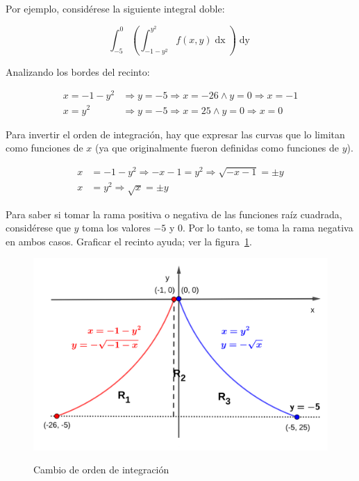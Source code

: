 \documentclass{article}
\begin{document}
\begin{enumerate}[(A)]
Por ejemplo, considérese la siguiente integral doble:

\begin{equation}
\int_{-5}^0 \left( \int_{-1-y^2}^{y^2} f(x,y) \mathop{dx} \right) \mathop{dy}
\end{equation}

Analizando los bordes del recinto:

\begin{align}
x = -1-y^2 &\Rightarrow y = -5 \Rightarrow x = -26 \wedge y = 0 \Rightarrow x = -1 \\
x = y^2 &\Rightarrow y = -5 \Rightarrow x =25 \wedge y = 0 \Rightarrow x = 0
\end{align}

Para invertir el orden de integración, hay que expresar las curvas que lo limitan como funciones de $x$ (ya que originalmente fueron definidas como funciones de $y$).

\begin{align}
x &= -1-y^2 \Rightarrow -x - 1 = y^2 \Rightarrow \sqrt{-x-1} = \pm y \\
x &= y^2 \Rightarrow \sqrt{x} = \pm y
\end{align}

Para saber si tomar la rama positiva o negativa de las funciones raíz cuadrada, considérese que $y$ toma los valores $-5$ y $0$. Por lo tanto, se toma la rama negativa en ambos casos. Graficar el recinto ayuda; ver la figura~\ref{fig:coi}.

\begin{figure}[ht]
\centering
\caption{Cambio de orden de integración}
\includegraphics[scale=0.75]{img/teo_fig020_coi.png}
\label{fig:coi}
\end{figure}


\end{enumerate}
\end{document}
